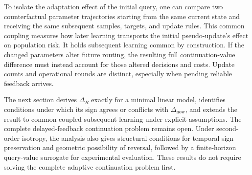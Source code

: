 To isolate the adaptation effect of the initial query, one can compare two
counterfactual parameter trajectories starting from the same current state
and receiving the same subsequent samples, targets, and update rules.
This common coupling measures how later learning transports the initial
pseudo-update's effect on population risk. It holds subsequent learning
common by construction. If the changed parameters alter future routing,
the resulting full continuation-value difference must instead account for
those altered decisions and costs. Update counts and operational rounds
are distinct, especially when pending reliable feedback arrives.

The next section derives $\Delta_R$ exactly for a minimal linear model,
identifies conditions under which its sign agrees or conflicts with
$\Delta_{\mathrm{now}}$, and extends the result to common-coupled subsequent
learning under explicit assumptions. The complete delayed-feedback
continuation problem remains open. Under second-order isotropy, the
analysis also gives structural conditions for temporal sign preservation
and geometric possibility of reversal, followed by a finite-horizon
query-value surrogate for experimental evaluation. These results do not
require solving the complete adaptive continuation problem first.
